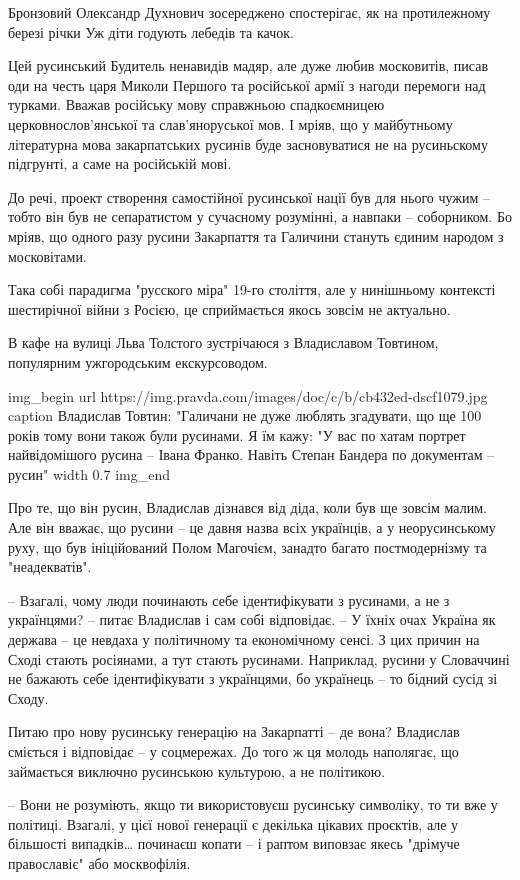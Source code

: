 Бронзовий Олександр Духнович зосереджено спостерігає, як на протилежному березі
річки Уж діти годують лебедів та качок.

Цей русинський Будитель ненавидів мадяр, але дуже любив московитів, писав оди
на честь царя Миколи Першого та російської армії з нагоди перемоги над турками.
Вважав російську мову справжньою спадкоємницею церковнослов’янської та
слав’яноруської мов. І мріяв, що у майбутньому літературна мова закарпатських
русинів буде засновуватися не на русиньскому підгрунті, а саме на російській
мові.

До речі, проект створення самостійної русинської нації був для нього чужим –
тобто він був не сепаратистом у сучасному розумінні, а навпаки – соборником. Бо
мріяв, що одного разу русини Закарпаття та Галичини стануть єдиним народом з
московітами.

Така собі парадигма "русского міра" 19-го століття, але у нинішньому контексті
шестирічної війни з Росією, це сприймається якось зовсім не актуально.

В кафе на вулиці Льва Толстого зустрічаюся з Владиславом Товтином, популярним
ужгородським екскурсоводом.

\ifcmt
img_begin 
    url https://img.pravda.com/images/doc/c/b/cb432ed-dscf1079.jpg
    caption Владислав Товтин: "Галичани не дуже люблять згадувати, що ще 100 років тому вони також були русинами. Я їм кажу: "У вас по хатам портрет найвідомішого русина – Івана Франко. Навіть Степан Бандера по документам – русин"
        width 0.7
img_end
\fi

Про те, що він русин, Владислав дізнався від діда, коли був ще зовсім малим.
Але він вважає, що русини – це давня назва всіх українців, а у неорусинському
руху, що був ініційований Полом Магочієм, занадто багато постмодернізму та
"неадекватів".

– Взагалі, чому люди починають себе ідентифікувати з русинами, а не з
українцями? – питає Владислав і сам собі відповідає. – У їхніх очах Україна як
держава – це невдаха у політичному та економічному сенсі. З цих причин на Сході
стають росіянами, а тут стають русинами. Наприклад, русини у Словаччині не
бажають себе ідентифікувати з українцями, бо українець – то бідний сусід зі
Сходу.

Питаю про нову русинську генерацію на Закарпатті – де вона? Владислав сміється
і відповідає – у соцмережах. До того ж ця молодь наполягає, що займається
виключно русинською культурою, а не політикою.

– Вони не розуміють, якщо ти використовуєш русинську символіку, то ти вже у
політиці. Взагалі, у цієї нової генерації є декілька цікавих проєктів, але у
більшості випадків… починаєш копати – і раптом виповзає якесь "дрімуче
православіє" або москвофілія.

